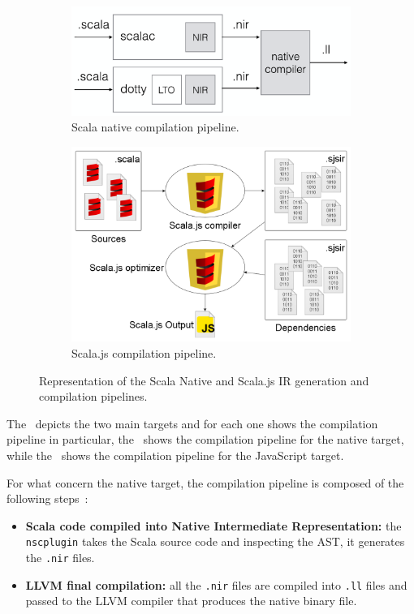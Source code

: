 \begin{figure}
	\centering
	\begin{subfigure}{.45\textwidth}
		\centering
		\includegraphics[width=0.95\linewidth]{figures/scala-native-ir.png}
		\caption{Scala native compilation pipeline.}
		\label{fig:scala-native-ir}
	\end{subfigure}
	\begin{subfigure}{.45\textwidth}
		\centering
		\includegraphics[width=.95\linewidth]{figures/compilation-pipeline.png}
		\caption{Scala.js compilation pipeline.}
		\label{fig:scala-js-ir}
	\end{subfigure}
	\caption{Representation of the Scala Native and Scala.js IR generation and compilation pipelines.}
	\label{fig:scala-ir}
\end{figure}

The~ depicts the two main targets and for each one shows the compilation pipeline in particular, the~
shows the compilation pipeline for the native target, while the~ shows the compilation pipeline for the JavaScript target.

For what concern the native target, the compilation pipeline is composed of the following steps~\cite{scala-native}:
\begin{itemize}
	\item \textbf{Scala code compiled into Native Intermediate Representation:} the \texttt{nscplugin} takes the Scala source code and inspecting the
	      AST, it generates the \texttt{.nir} files.
	\item \textbf{LLVM final compilation:} all the \texttt{.nir} files are compiled into \texttt{.ll} files and passed to the LLVM compiler that
	      produces the native binary file.
\end{itemize}

